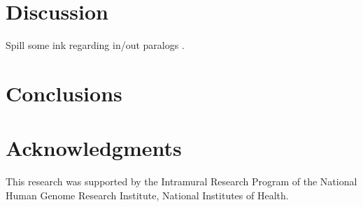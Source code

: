 \documentclass[nogrid]{MBE}%
\begin{document}
\section{Discussion}
Spill some ink regarding in/out paralogs \cite{Sonnhammer:2002vm,Tekaia:2016ga}.

\section{Conclusions}

\section{Acknowledgments}
This research was supported by the Intramural Research Program of the National Human Genome Research Institute, National Institutes of Health.





\end{document}
